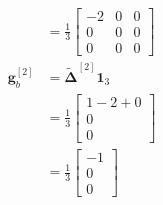 \begin{itemize}
\begin{align*}
    &= \frac{1}{3}\begin{bmatrix} -2 & 0 & 0 \\ 0 & 0 & 0 \\ 0 & 0 & 0 \end{bmatrix} \\
    \mathbf{g}_b^{[2]} &= \widetilde{\boldsymbol{\Delta}}^{[2]}\mathbf{1}_3 \\
    &= \frac{1}{3}\begin{bmatrix} 1 - 2 + 0 \\ 0 \\ 0 \end{bmatrix} \\
    &= \frac{1}{3}\begin{bmatrix} -1 \\ 0 \\ 0 \end{bmatrix}
    \end{align*}


\end{itemize}
